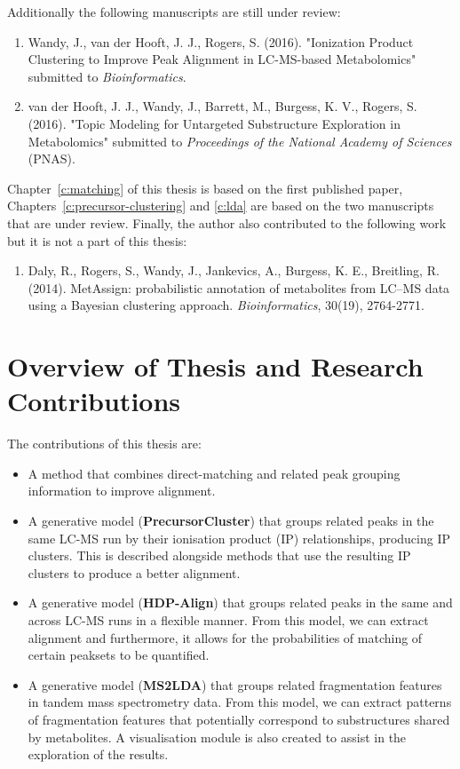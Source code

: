 Additionally the following manuscripts are still under review:

\begin{enumerate}
\item Wandy, J., van der Hooft, J. J., Rogers, S. (2016). "Ionization Product Clustering to Improve Peak Alignment in LC-MS-based Metabolomics" submitted to \textit{Bioinformatics}.
\item van der Hooft, J. J., Wandy, J., Barrett, M., Burgess, K. V., Rogers, S. (2016). "Topic Modeling for Untargeted Substructure Exploration in Metabolomics" submitted to \textit{Proceedings of the National Academy of Sciences} (PNAS).
\end{enumerate}

Chapter~\ref{c:matching} of this thesis is based on the first published paper, Chapters~\ref{c:precursor-clustering} and \ref{c:lda} are based on the two manuscripts that are under review. Finally, the author also contributed to the following work but it is not a part of this thesis:

\begin{enumerate}
\item Daly, R., Rogers, S., Wandy, J., Jankevics, A., Burgess, K. E., Breitling, R. (2014). MetAssign: probabilistic annotation of metabolites from LC–MS data using a Bayesian clustering approach. \textit{Bioinformatics}, 30(19), 2764-2771.
\end{enumerate}

\section{Overview of Thesis and Research Contributions}

The contributions of this thesis are:

\begin{itemize}
\item A method that combines direct-matching and related peak grouping information to improve alignment.
\item A generative model (\textbf{PrecursorCluster}) that groups related peaks in the same LC-MS run by their ionisation product (IP) relationships, producing IP clusters. This is described alongside methods that use the resulting IP clusters to produce a better alignment.
\item A generative model (\textbf{HDP-Align}) that groups related peaks in the same and across LC-MS runs in a flexible manner. From this model, we can extract alignment and furthermore, it allows for the probabilities of matching of certain peaksets to be quantified.
\item A generative model (\textbf{MS2LDA}) that groups related fragmentation features in tandem mass spectrometry data. From this model, we can extract patterns of fragmentation features that potentially correspond to substructures shared by metabolites. A visualisation module is also created to assist in the exploration of the results.
\end{itemize}

